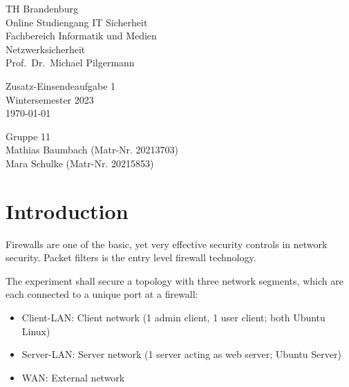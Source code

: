 \documentclass{article}
\begin{document}
\begin{titlepage}
	\begin{flushleft}
		TH Brandenburg \\
		Online Studiengang IT Sicherheit \\
		Fachbereich Informatik und Medien \\
		Netzwerksicherheit \\
		Prof.\ Dr.\ Michael Pilgermann
	\end{flushleft}

	\vfill

	\begin{center}
		\Large{Zusatz-Einsendeaufgabe 1}\\[0.5em]
		\large{Wintersemester 2023}\\[0.25em]
		\large{\today}
	\end{center}

	\vfill

	\begin{flushright}
		Gruppe 11 \\
		Mathias Baumbach (Matr-Nr. 20213703) \\
		Mara Schulke (Matr-Nr. 20215853)
	\end{flushright}
\end{titlepage}

\begin{abstract}
\end{abstract}

\tableofcontents

\listoffigures

\newpage

\section{Introduction}

Firewalls are one of the basic, yet very effective security controls in network 
security. Packet filters is the entry level firewall technology.

The experiment shall secure a topology with three network segments, which are each 
connected to a unique port at a firewall:

\begin{itemize}
    \item Client-LAN: Client network (1 admin client, 1 user client; both Ubuntu Linux)
    \item Server-LAN: Server network (1 server acting as web server; Ubuntu Server)
    \item WAN: External network
\end{itemize}
\end{document}
